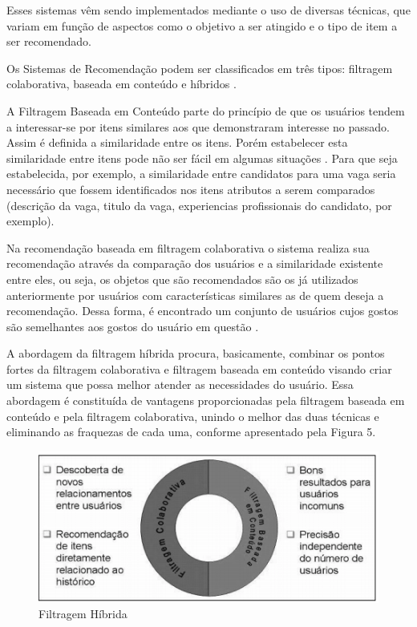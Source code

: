 \documentclass[conference]{IEEEtran}
\begin{document}
 Esses sistemas vêm sendo implementados mediante o uso de diversas técnicas, que variam em função de aspectos como o objetivo a ser atingido e o tipo de item a ser recomendado.
    
Os Sistemas de Recomendação podem ser classificados em três tipos: filtragem colaborativa, baseada em conteúdo e híbridos \cite{sistema_recomendacao_3}. 

A Filtragem Baseada em Conteúdo parte do princípio de que os usuários tendem a interessar-se por itens similares aos que demonstraram interesse no passado. Assim é definida a similaridade entre os itens. Porém estabelecer esta similaridade entre itens pode não ser fácil em algumas situações \cite{sistema_recomendacao_content}. Para que seja estabelecida, por exemplo, a similaridade entre candidatos para uma vaga seria necessário que fossem identificados nos itens atributos a serem comparados (descrição da vaga, titulo da vaga, experiencias profissionais do candidato, por exemplo).

Na recomendação baseada em filtragem colaborativa o sistema realiza sua recomendação através da comparação dos usuários e a similaridade existente entre eles, ou seja, os objetos que são recomendados são os já utilizados anteriormente por usuários com características similares as de quem deseja a recomendação. Dessa forma, é encontrado um conjunto de usuários cujos gostos são semelhantes aos gostos do usuário em questão \cite{sistema_recomendacao_content}.
    
A abordagem da filtragem híbrida procura, basicamente, combinar os pontos fortes da filtragem colaborativa e filtragem baseada em conteúdo visando criar um sistema que possa melhor atender as necessidades do usuário. Essa abordagem é constituída de vantagens proporcionadas pela filtragem baseada em conteúdo e pela filtragem colaborativa, unindo o melhor das duas técnicas e eliminando as fraquezas de cada uma, conforme apresentado pela Figura 5.

\begin{figure}[htbp]
	\centerline{\includegraphics[scale=.5]{imagens/filtragem_hibrida.png}}
	\caption{ Filtragem Híbrida}
	\label{fig}
	\end{figure}
\end{document}
